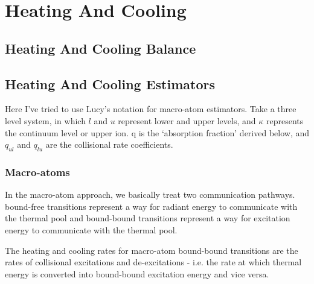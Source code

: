 
\section{Heating And Cooling}

\subsection{Heating And Cooling Balance}

\subsection{Heating And Cooling Estimators}


Here I've tried to use Lucy's notation for macro-atom estimators. Take a three level system, in
which $l$ and $u$ represent lower and upper levels, 
and $\kappa$ represents the continuum level or upper ion.
q is the `absorption fraction' derived below, and $q_{ul}$ and $q_{lu}$ are the collisional
rate coefficients.

\subsubsection{Macro-atoms}

\noindent
In the macro-atom approach, we basically treat two communication pathways.
bound-free transitions represent a way
for radiant energy to communicate with the thermal pool
and bound-bound transitions represent a way
for excitation energy to communicate with the thermal pool.
\bigskip

\noindent
The heating and cooling rates for macro-atom bound-bound transitions are the rates of
collisional excitations and de-excitations
- i.e. the rate at which thermal energy is converted into
bound-bound excitation energy and vice versa.

